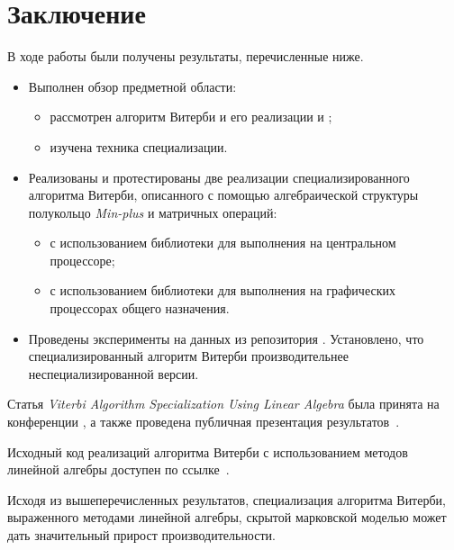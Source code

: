 \newpage
\section{Заключение}
В ходе работы были получены результаты, перечисленные ниже.
\begin{itemize}
	\item Выполнен обзор предметной области:
		\begin{itemize}
			\item рассмотрен алгоритм Витерби и его реализации  и ;
			\item изучена техника специализации.
		\end{itemize}
	\item Реализованы и протестированы две реализации специализированного алгоритма Витерби, описанного с помощью алгебраической структуры полукольцо \emph{Min-plus} и матричных операций:
		\begin{itemize}
			\item с использованием библиотеки  для выполнения на центральном процессоре;
			\item с использованием библиотеки  для выполнения на графических процессорах общего назначения.
		\end{itemize}
	\item Проведены эксперименты на данных из репозитория . 
Установлено, что специализированный алгоритм Витерби производительнее неспециализированной версии.
\end{itemize}

Статья \emph{Viterbi Algorithm Specialization Using Linear 
Algebra} была принята на конференции , а 
также проведена публичная презентация результатов~\cite{paper}.

Исходный код реализаций алгоритма Витерби с использованием методов линейной алгебры доступен по ссылке~\cite{repo}.

Исходя из вышеперечисленных результатов, специализация 
алгоритма Витерби, выраженного методами линейной алгебры, 
скрытой марковской моделью может дать значительный прирост 
производительности.
